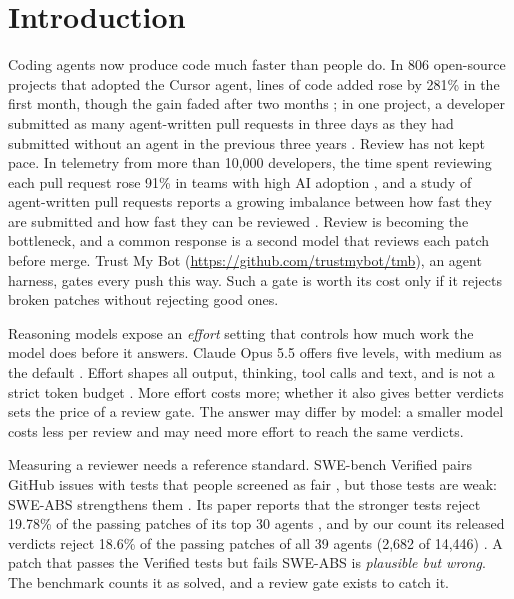 \documentclass[sigconf,nonacm]{acmart}
\begin{document}

\maketitle

\section{Introduction}\label{sec:intro}

Coding agents now produce code much faster than people do. In 806 open-source projects that adopted the Cursor agent, lines of code added rose by 281\% in the first month, though the gain faded after two months \cite{he2026cursor}; in one project, a developer submitted as many agent-written pull requests in three days as they had submitted without an agent in the previous three years \cite{li2025teammates}. Review has not kept pace. In telemetry from more than 10,000 developers, the time spent reviewing each pull request rose 91\% in teams with high AI adoption \cite{farosai2025paradox}, and a study of agent-written pull requests reports a growing imbalance between how fast they are submitted and how fast they can be reviewed \cite{li2025teammates}. Review is becoming the bottleneck, and a common response is a second model that reviews each patch before merge. Trust My Bot (\url{https://github.com/trustmybot/tmb}), an agent harness, gates every push this way. Such a gate is worth its cost only if it rejects broken patches without rejecting good ones.

Reasoning models expose an \textit{effort} setting that controls how much work the model does before it answers. Claude Opus 5.5 offers five levels, with medium as the default \cite{anthropic2026effort,anthropic2026model}. Effort shapes all output, thinking, tool calls and text, and is not a strict token budget \cite{anthropic2026effort}. More effort costs more; whether it also gives better verdicts sets the price of a review gate. The answer may differ by model: a smaller model costs less per review and may need more effort to reach the same verdicts.

Measuring a reviewer needs a reference standard. SWE-bench Verified pairs GitHub issues with tests that people screened as fair \cite{chowdhury2024verified,jimenez2024swebench}, but those tests are weak: SWE-ABS strengthens them \cite{yu2026sweabs}. Its paper reports that the stronger tests reject 19.78\% of the passing patches of its top 30 agents \cite{yu2026sweabs}, and by our count its released verdicts reject 18.6\% of the passing patches of all 39 agents (2,682 of 14,446) \cite{openagenteval2026sweabs}. A patch that passes the Verified tests but fails SWE-ABS is \textit{plausible but wrong}. The benchmark counts it as solved, and a review gate exists to catch it.
\end{document}
